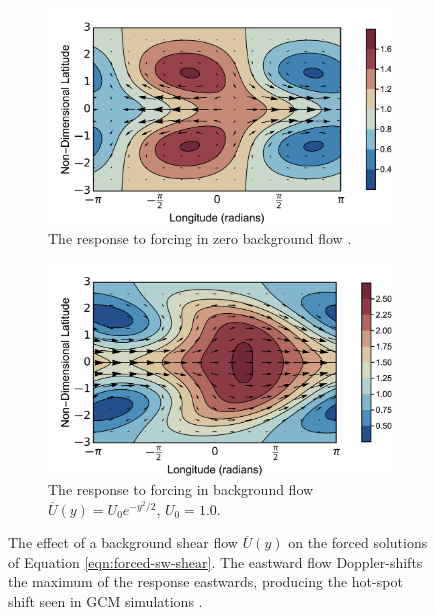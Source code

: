 \begin{figure}
  \centering
  \begin{subfigure}[t]{0.48\textwidth}
    \includegraphics[width=\textwidth]{figures/wave-mean-flow/ps-no-flow.png}
    \caption{The response to forcing in zero background flow \citep{matsuno1966quasi}.}
    \label{fig:ps-no-flow}
  \end{subfigure}
\quad
  \begin{subfigure}[t]{0.48\textwidth}
    \includegraphics[width=\textwidth]{figures/wave-mean-flow/ps-shear-flow.png}
    \caption{The response to forcing in background flow $\overline{U}(y) =  U_{0} e^{-y^{2}/2}$, $U_{0}=1.0$.}
    \label{fig:ps-shear-flow}
  \end{subfigure}
  \caption{The effect of a background shear flow $\overline{U}(y)$ on the forced solutions of Equation \ref{eqn:forced-sw-shear}. The eastward flow Doppler-shifts the maximum of the response eastwards, producing the hot-spot shift seen in GCM simulations \citep{tsai2014three}.}
  \label{fig:ps-flow}
\end{figure}

